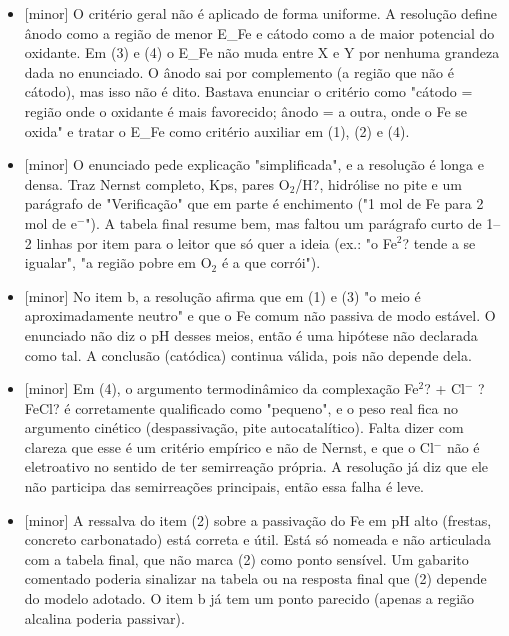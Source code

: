 \documentclass{article}%
\begin{document}
\begin{itemize}%
\item%
{[}minor{]} O critério geral não é aplicado de forma uniforme. A resolução define ânodo como a região de menor E\_Fe e cátodo como a de maior potencial do oxidante. Em (3) e (4) o E\_Fe não muda entre X e Y por nenhuma grandeza dada no enunciado. O ânodo sai por complemento (a região que não é cátodo), mas isso não é dito. Bastava enunciar o critério como "cátodo = região onde o oxidante é mais favorecido; ânodo = a outra, onde o Fe se oxida" e tratar o E\_Fe como critério auxiliar em (1), (2) e (4).%
\item%
{[}minor{]} O enunciado pede explicação "simplificada", e a resolução é longa e densa. Traz Nernst completo, Kps, pares O$_{2}$/H?, hidrólise no pite e um parágrafo de "Verificação" que em parte é enchimento ("1 mol de Fe para 2 mol de e$^{-}$"). A tabela final resume bem, mas faltou um parágrafo curto de 1--2 linhas por item para o leitor que só quer a ideia (ex.: "o Fe$^2$? tende a se igualar", "a região pobre em O$_{2}$ é a que corrói").%
\item%
{[}minor{]} No item b, a resolução afirma que em (1) e (3) "o meio é aproximadamente neutro" e que o Fe comum não passiva de modo estável. O enunciado não diz o pH desses meios, então é uma hipótese não declarada como tal. A conclusão (catódica) continua válida, pois não depende dela.%
\item%
{[}minor{]} Em (4), o argumento termodinâmico da complexação Fe$^2$? + Cl$^{-}$ ? FeCl? é corretamente qualificado como "pequeno", e o peso real fica no argumento cinético (despassivação, pite autocatalítico). Falta dizer com clareza que esse é um critério empírico e não de Nernst, e que o Cl$^{-}$ não é eletroativo no sentido de ter semirreação própria. A resolução já diz que ele não participa das semirreações principais, então essa falha é leve.%
\item%
{[}minor{]} A ressalva do item (2) sobre a passivação do Fe em pH alto (frestas, concreto carbonatado) está correta e útil. Está só nomeada e não articulada com a tabela final, que não marca (2) como ponto sensível. Um gabarito comentado poderia sinalizar na tabela ou na resposta final que (2) depende do modelo adotado. O item b já tem um ponto parecido (apenas a região alcalina poderia passivar).%
\end{itemize}%
\end{document}
